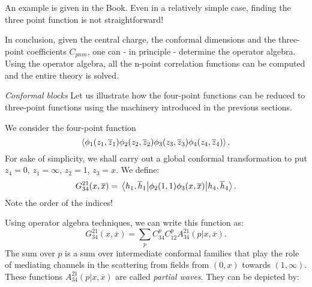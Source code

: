 \documentclass[submission, PhysLectNotes]{SciPost}
\begin{document}
An example is given in the Book. Even in a relatively simple case, finding the three point function is not straightforward!

In conclusion, given the central charge, the conformal dimensions and the three-point coefficients $C_{pnm}$, one can - in principle - determine the operator algebra. Using the operator algebra, all the n-point correlation functions can be computed and the entire theory is solved.

{\it Conformal blocks}
Let us illustrate how the four-point functions can be reduced to three-point functions using the machinery introduced in the previous sections.

We consider the four-point function
\begin{equation}
	\expval{\phi_1(z_1,\overline{z}_1)\phi_2(z_2,\overline{z}_2)\phi_3(z_3,\overline{z}_3)\phi_4(z_4,\overline{z}_4)}.
\end{equation}
For sake of simplicity, we shall carry out a global conformal transformation to put $z_4 = 0$, $z_1 = \infty$, $z_2 = 1$, $z_3 = x$.
We define:
\begin{equation}
	G_{34}^{21}(x,\overline{x}) = \mel{h_1,\overline{h}_1}{\phi_2(1,1)\phi_3(x,\overline{x})}{h_4,\overline{h}_4}.
\end{equation}
Note the order of the indices!

Using operator algebra techniques, we can write this function as:
\begin{equation}
	G_{34}^{21}(x,\overline{x}) = \sum_p C_{34}^p C_{12}^p A_{34}^{21}(p|x,\overline{x}).
\end{equation}
The sum over $p$ is a sum over intermediate conformal families that play the role of mediating channels in the scattering from fields from $(0,x)$ towards $(1,\infty)$. These functions $A_{34}^{21}(p|x,\overline{x})$ are called \emph{partial waves}. They can be depicted by:
\begin{figure}[htb]
\centering
{}
\end{figure}
\end{document}
